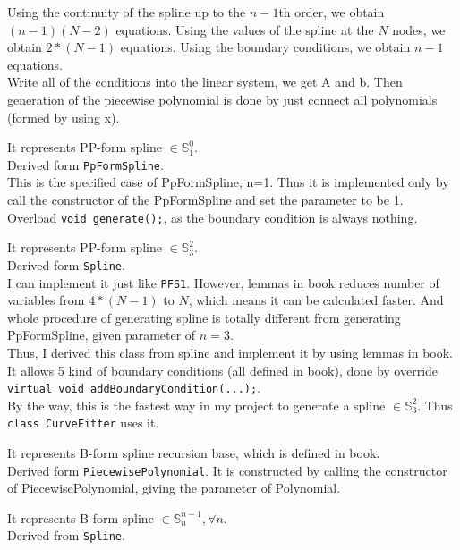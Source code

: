 \documentclass[a4paper]{article}
\begin{document}
\begin{description}
  Using the continuity of the spline up to the \(n-1\)th order, we obtain \((n-1)(N-2)\) equations.  
  Using the values of the spline at the \(N\) nodes, we obtain \(2*(N-1)\) equations.  
  Using the boundary conditions, we obtain \(n-1\) equations.\\
  Write all of the conditions into the linear system, we get A and b. 
  Then generation of the piecewise polynomial is done by just connect all polynomials (formed by using x).
  \item[PFS1]
  It represents PP-form spline $\in \mathbb{S}_1^0$.\\ 
  Derived form \texttt{PpFormSpline}.\\
  This is the specified case of PpFormSpline, n=1. Thus it is implemented only by call the constructor of the PpFormSpline and set the parameter to be 1.\\
  Overload \texttt{void generate();}, as the boundary condition is always nothing.
  \item[PFS3]
  It represents PP-form spline $\in \mathbb{S}_3^2$.\\ 
  Derived form \texttt{Spline}.\\
  I can implement it just like \texttt{PFS1}. 
  However, lemmas\cite*{Lemmas_constructing_pp-form_splines} in book reduces number of variables from \(4*(N-1)\) to \(N\), 
  which means it can be calculated faster. 
  And whole procedure of generating spline is totally different from generating PpFormSpline, given parameter of $n=3$. \\
  Thus, I derived this class from spline and implement it by using lemmas in book.\\
  It allows 5 kind of boundary conditions (all defined in book\cite{Defn_3_5}), done by override \texttt{virtual void addBoundaryCondition(...);}.\\
  By the way, this is the fastest way in my project to generate a spline $\in \mathbb{S}_3^2$. Thus \texttt{class CurveFitter} uses it.
  \item[BFSRB]
  It represents B-form spline recursion base, which is defined in book\cite*{Defn_3_23}. \\
  Derived form \texttt{PiecewisePolynomial}. It is constructed by calling the constructor of PiecewisePolynomial, giving the parameter of Polynomial.\\
  \item[BFormSpline]
  It represents B-form spline $\in \mathbb{S}_n^{n-1}, \forall n$.\\
  Derived from \texttt{Spline}.\\

\end{description}
\end{document}
